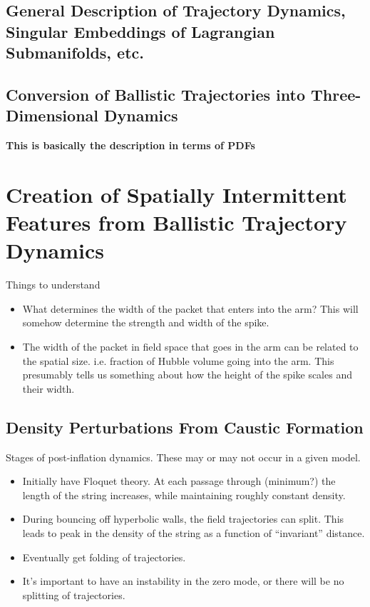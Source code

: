 \documentclass[11pt,a4paper]{article}
\begin{document}
\subsection{General Description of Trajectory Dynamics, Singular Embeddings of Lagrangian Submanifolds, etc.}

\subsection{Conversion of Ballistic Trajectories into Three-Dimensional Dynamics}
{\bf This is basically the description in terms of PDFs}

\section{Creation of Spatially Intermittent Features from Ballistic Trajectory Dynamics} 
Things to understand
\begin{itemize}
\item What determines the width of the packet that enters into the arm?  This will somehow determine the strength and width of the spike.
\item The width of the packet in field space that goes in the arm can be related to the spatial size.  i.e. fraction of Hubble volume going into the arm.  This presumably tells us something about how the height of the spike scales and their width.
\end{itemize}

\subsection{Density Perturbations From Caustic Formation}
Stages of post-inflation dynamics.  These may or may not occur in a given model.
\begin{itemize}
\item Initially have Floquet theory.  At each passage through (minimum?) the length of the string increases, while maintaining roughly constant density.
\item During bouncing off hyperbolic walls, the field trajectories can split.  This leads to peak in the density of the string as a function of ``invariant'' distance.
\item Eventually get folding of trajectories.
\item It's important to have an instability in the zero mode, or there will be no splitting of trajectories.
\end{itemize}
\end{document}
